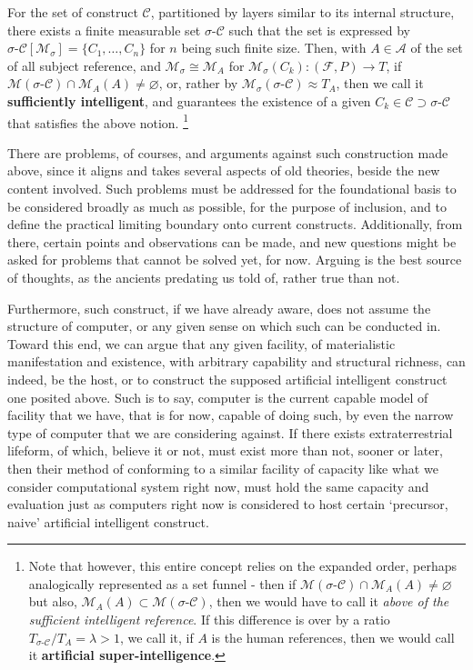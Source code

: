 \begin{conjecture}
\begin{enumerate}[itemsep=1pt,topsep=1pt]
    \end{enumerate}
    For the set of construct $\mathcal{C}$, partitioned by layers similar to its internal structure, there exists a finite measurable set $\sigma\text{-}\mathcal{C}$ such that the set is expressed by $\sigma\text{-}\mathcal{C}[\mathcal{M}_{\sigma}]=\{C_{1},\dots,C_{n}\}$ for $n$ being such finite size. Then, with $A\in \mathcal{A}$ of the set of all subject reference, and $\mathcal{M}_{\sigma}\cong \mathcal{M}_{A}$ for $\mathcal{M}_{\sigma}(C_{k}): (\mathcal{F},P)\to T$, if $\mathcal{M}(\sigma\text{-}\mathcal{C})\cap \mathcal{M}_{A}(A)\neq \varnothing$, or, rather by $\mathcal{M}_{\sigma}(\sigma\text{-}\mathcal{C})\approx T_{A}$, then we call it \textbf{sufficiently intelligent}, and guarantees the existence of a given $C_{k}\in \mathcal{C}\supset \mathcal{\sigma\text{-}\mathcal{C}}$ that satisfies the above notion. \footnote{Note that however, this entire concept relies on the expanded order, perhaps analogically represented as a set funnel - then if $\mathcal{M}(\sigma\text{-}\mathcal{C})\cap \mathcal{M}_{A}(A)\neq \varnothing$ but also, $\mathcal{M}_{A}(A)\subset\mathcal{M}(\sigma\text{-}\mathcal{C})$, then we would have to call it \textit{above of the sufficient intelligent reference}. If this difference is over by a ratio $T_{\sigma\text{-}\mathcal{C}}/T_{A} = \lambda > 1$, we call it, if $A$ is the human references, then we would call it \textbf{artificial super-intelligence}.}
\end{conjecture}
There are problems, of courses, and arguments against such construction made above, since it aligns and takes several aspects of old theories, beside the new content involved. Such problems must be addressed for the foundational basis to be considered broadly as much as possible, for the purpose of inclusion, and to define the practical limiting boundary onto current constructs. Additionally, from there, certain points and observations can be made, and new questions might be asked for problems that cannot be solved yet, for now. Arguing is the best source of thoughts, as the ancients predating us told of, rather true than not.

Furthermore, such construct, if we have already aware, does not assume the structure of computer, or any given sense on which such can be conducted in. Toward this end, we can argue that any given facility, of materialistic manifestation and existence, with arbitrary capability and structural richness, can indeed, be the host, or to construct the supposed artificial intelligent construct one posited above. Such is to say, computer is the current capable model of facility that we have, that is for now, capable of doing such, by even the narrow type of computer that we are considering against. If there exists extraterrestrial lifeform, of which, believe it or not, must exist more than not, sooner or later, then their method of conforming to a similar facility of capacity like what we consider computational system right now, must hold the same capacity and evaluation just as computers right now is considered to host certain `precursor, naive' artificial intelligent construct. 

